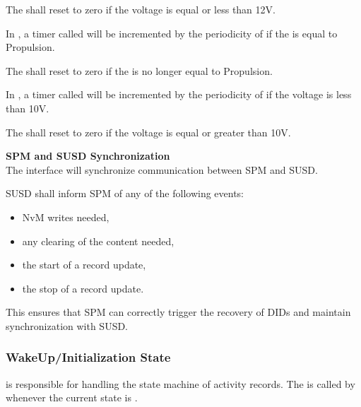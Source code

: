 {The  shall reset to zero if the voltage is equal or less than 12V.}
{}

{In , a timer called  will be incremented by the periodicity of  if the  is equal to Propulsion.}
{}

{The  shall reset to zero if the  is no longer equal to Propulsion.}
{}

{In , a timer called  will be incremented by the periodicity of  if the voltage is less than 10V.}
{}

{The  shall reset to zero if the voltage is equal or greater than 10V.}
{}


{
\textbf{SPM and SUSD Synchronization} \\
The  interface will synchronize communication between SPM and SUSD.

SUSD shall inform SPM of any of the following events:
\begin{itemize}
    \item NvM writes needed,
    \item any clearing of the content needed,
    \item the start of a record update,
    \item the stop of a record update.
\end{itemize}
This ensures that SPM can correctly trigger the recovery of DIDs and maintain synchronization with SUSD.
}
{ }

\subsubsection{WakeUp/Initialization State}

{ is responsible for handling the state machine of activity records. 
The  is called by  whenever the current state is .}
{}

